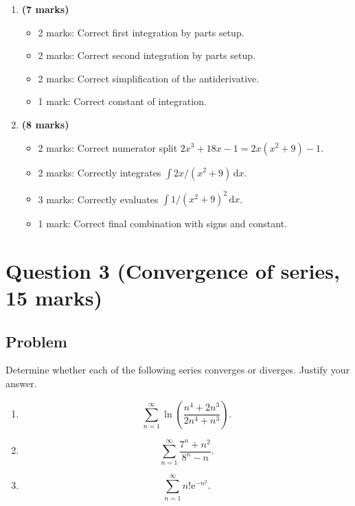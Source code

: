 \documentclass[12pt]{article}
\newcommand{\dd}{\,\mathrm{d}}
\newcommand{\ee}{\mathrm{e}}
\begin{document}
\begin{enumerate}[label=(\alph*)]
\item \textbf{(7 marks)}
\begin{itemize}
\item 2 marks: Correct first integration by parts setup.
\item 2 marks: Correct second integration by parts setup.
\item 2 marks: Correct simplification of the antiderivative.
\item 1 mark: Correct constant of integration.
\end{itemize}

\item \textbf{(8 marks)}
\begin{itemize}
\item 2 marks: Correct numerator split $2x^3+18x-1=2x(x^2+9)-1$.
\item 2 marks: Correctly integrates $\int 2x/(x^2+9)\dd x$.
\item 3 marks: Correctly evaluates $\int 1/(x^2+9)^2\dd x$.
\item 1 mark: Correct final combination with signs and constant.
\end{itemize}
\end{enumerate}

\newpage
\section{Question 3 (Convergence of series, 15 marks)}

\subsection{Problem}

Determine whether each of the following series converges or diverges. Justify your answer.

\begin{enumerate}[label=(\alph*)]
\item
\[
\sum_{n=1}^{\infty}
\ln\left(\frac{n^4+2n^3}{2n^4+n^3}\right).
\]

\item
\[
\sum_{n=1}^{\infty}
\frac{7^n+n^2}{8^n-n}.
\]

\item
\[
\sum_{n=1}^{\infty} n!\ee^{-n^2}.
\]
\end{enumerate}


\bigskip
\end{document}
